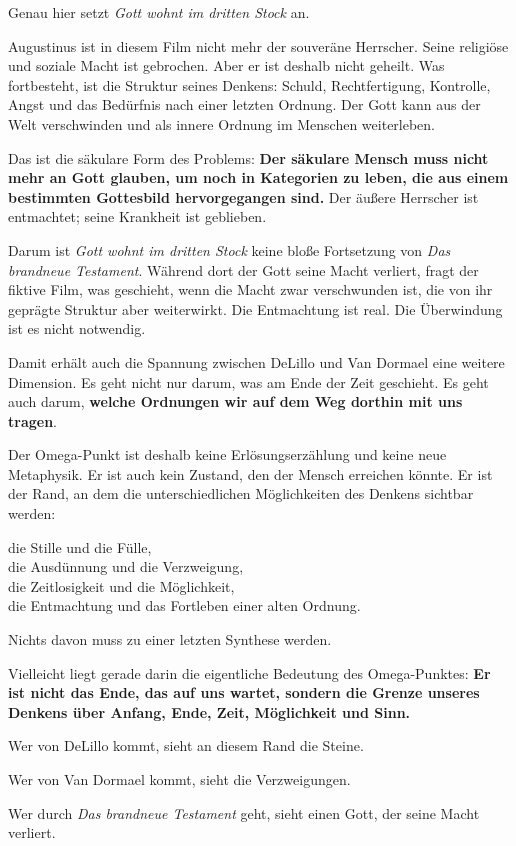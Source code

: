 \documentclass[
  ngerman,
]{article}
\begin{document}
Genau hier setzt \emph{Gott wohnt im dritten Stock} an.

Augustinus ist in diesem Film nicht mehr der souveräne Herrscher. Seine
religiöse und soziale Macht ist gebrochen. Aber er ist deshalb nicht
geheilt. Was fortbesteht, ist die Struktur seines Denkens: Schuld,
Rechtfertigung, Kontrolle, Angst und das Bedürfnis nach einer letzten
Ordnung. Der Gott kann aus der Welt verschwinden und als innere Ordnung
im Menschen weiterleben.

Das ist die säkulare Form des Problems: \textbf{Der säkulare Mensch muss
nicht mehr an Gott glauben, um noch in Kategorien zu leben, die aus
einem bestimmten Gottesbild hervorgegangen sind.} Der äußere Herrscher
ist entmachtet; seine Krankheit ist geblieben.

Darum ist \emph{Gott wohnt im dritten Stock} keine bloße Fortsetzung von
\emph{Das brandneue Testament}. Während dort der Gott seine Macht
verliert, fragt der fiktive Film, was geschieht, wenn die Macht zwar
verschwunden ist, die von ihr geprägte Struktur aber weiterwirkt. Die
Entmachtung ist real. Die Überwindung ist es nicht notwendig.

Damit erhält auch die Spannung zwischen DeLillo und Van Dormael eine
weitere Dimension. Es geht nicht nur darum, was am Ende der Zeit
geschieht. Es geht auch darum, \textbf{welche Ordnungen wir auf dem Weg
dorthin mit uns tragen}.

Der Omega-Punkt ist deshalb keine Erlösungserzählung und keine neue
Metaphysik. Er ist auch kein Zustand, den der Mensch erreichen könnte.
Er ist der Rand, an dem die unterschiedlichen Möglichkeiten des Denkens
sichtbar werden:

die Stille und die Fülle,\\
die Ausdünnung und die Verzweigung,\\
die Zeitlosigkeit und die Möglichkeit,\\
die Entmachtung und das Fortleben einer alten Ordnung.

Nichts davon muss zu einer letzten Synthese werden.

Vielleicht liegt gerade darin die eigentliche Bedeutung des
Omega-Punktes: \textbf{Er ist nicht das Ende, das auf uns wartet,
sondern die Grenze unseres Denkens über Anfang, Ende, Zeit, Möglichkeit
und Sinn.}

Wer von DeLillo kommt, sieht an diesem Rand die Steine.

Wer von Van Dormael kommt, sieht die Verzweigungen.

Wer durch \emph{Das brandneue Testament} geht, sieht einen Gott, der
seine Macht verliert.
\end{document}

